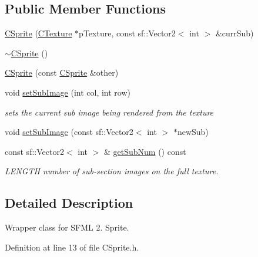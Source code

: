 \subsection*{Public Member Functions}
\begin{DoxyCompactItemize}
\item 
\hyperlink{classengine_1_1CSprite_afee71593c773fc2e5023c7cde25c62b7}{C\-Sprite} (\hyperlink{classengine_1_1CTexture}{C\-Texture} $\ast$p\-Texture, const sf\-::\-Vector2$<$ int $>$ \&curr\-Sub)
\item 
\hyperlink{classengine_1_1CSprite_ab41599f2659050183b1c9d8146a36d95}{$\sim$\-C\-Sprite} ()
\item 
\hyperlink{classengine_1_1CSprite_a70c425b9393b4b5549b4097a23bdd3ad}{C\-Sprite} (const \hyperlink{classengine_1_1CSprite}{C\-Sprite} \&other)
\item 
void \hyperlink{classengine_1_1CSprite_a31972fa55d36889cf4aa079f42a01144}{set\-Sub\-Image} (int col, int row)
\begin{DoxyCompactList}\small\item\em sets the current sub image being rendered from the texture \end{DoxyCompactList}\item 
void \hyperlink{classengine_1_1CSprite_a2d0b4730d905e5ae6a40023cbed77201}{set\-Sub\-Image} (const sf\-::\-Vector2$<$ int $>$ $\ast$new\-Sub)
\item 
const sf\-::\-Vector2$<$ int $>$ \& \hyperlink{classengine_1_1CSprite_af145f98a563284beed13fad53abe964a}{get\-Sub\-Num} () const 
\begin{DoxyCompactList}\small\item\em L\-E\-N\-G\-T\-H number of sub-\/section images on the full texture. \end{DoxyCompactList}\end{DoxyCompactItemize}


\subsection{Detailed Description}
Wrapper class for S\-F\-M\-L 2. Sprite. 

Definition at line 13 of file C\-Sprite.\-h.



